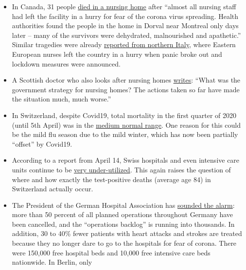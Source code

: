 \begin{itemize}
{  remained largely empty}, with just 19 patients being treated at the
  facility over the Easter weekend. London's established hospitals have
  doubled their ICU capacity, and are so far coping with surge.
\item
  In Canada, 31 people
  \href{https://www.nytimes.com/2020/04/16/world/canada/montreal-nursing-homes-coronavirus.html}{died
  in a nursing home} after ``almost all nursing staff had left the
  facility in a hurry for fear of the corona virus spreading. Health
  authorities found the people in the home in Dorval near Montreal only
  days later -- many of the survivors were dehydrated, malnourished and
  apathetic.'' Similar tragedies were already
  \href{https://swprs.org/covid-19-a-report-from-italy/}{reported from
  northern Italy}, where Eastern European nurses left the country in a
  hurry when panic broke out and lockdown measures were announced.
\item
  A Scottish doctor who also looks after nursing homes
  \href{https://drmalcolmkendrick.org/2020/04/17/care-homes-and-covid19/}{writes}:
  ``What was the government strategy for nursing homes? The actions
  taken so far have made the situation much, much worse.''
\item
  In Switzerland, despite Covid19, total mortality in the first quarter
  of 2020 (until 5th April) was in the
  \href{https://swprs.files.wordpress.com/2020/04/ch-sterblichkeit-kumuliert-q1-2020.pdf}{medium
  normal range}. One reason for this could be the mild flu season due to
  the mild winter, which has now been partially ``offset'' by Covid19.
\item
  According to a report from April 14, Swiss hospitals and even
  intensive care units continue to be
  \href{https://swprs.files.wordpress.com/2020/04/intensivbettenbelegung-schweiz-2020-04-14.png}{very
  under-utilized}. This again raises the question of where and how
  exactly the test-positive deaths (average age 84) in Switzerland
  actually occur.
\item
  The President of the German Hospital Association has
  \href{https://www.bz-berlin.de/deutschland/kliniken-verband-schlaegt-alarm-wegen-corona-regeln}{sounded
  the alarm}: more than 50 percent of all planned operations throughout
  Germany have been cancelled, and the ``operations backlog'' is running
  into thousands. In addition, 30 to 40\% fewer patients with heart
  attacks and strokes are treated because they no longer dare to go to
  the hospitals for fear of corona. There were 150,000 free hospital
  beds and 10,000 free intensive care beds nationwide. In Berlin, only

\end{itemize}
